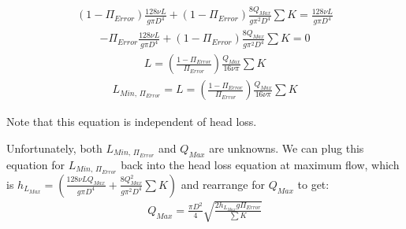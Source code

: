 \documentclass[letterpaper,10pt,english]{sphinxmanual}
\begin{document}
\begin{equation}\label{equation:Flow_Control_and_Measurement/FCM_Derivations:Flow_Control_and_Measurement/FCM_Derivations:28}
\begin{split}\left( 1 - \Pi_{Error} \right)  \frac{128 \nu L}{g \pi D^4} + \left( 1 - \Pi_{Error} \right) \frac{8 Q_{Max}}{g \pi ^2 D^4} \sum{K}  =  \frac{128 \nu L}{g \pi D^4}\end{split}
\end{equation}\begin{equation}\label{equation:Flow_Control_and_Measurement/FCM_Derivations:Flow_Control_and_Measurement/FCM_Derivations:29}
\begin{split}- \Pi_{Error} \frac{128 \nu L}{g \pi D^4} + \left( 1 - \Pi_{Error} \right) \frac{8 Q_{Max}}{g \pi^2 D^4} \sum{K}  = 0\end{split}
\end{equation}\begin{equation}\label{equation:Flow_Control_and_Measurement/FCM_Derivations:Flow_Control_and_Measurement/FCM_Derivations:30}
\begin{split}L = \left( \frac{1 - \Pi_{Error}}{\Pi_{Error}} \right) \frac{Q_{Max}}{16 \nu \pi} \sum{K}\end{split}
\end{equation}\begin{equation}\label{equation:Flow_Control_and_Measurement/FCM_Derivations:Flow_Control_and_Measurement/FCM_Derivations:31}
\begin{split}L_{Min, \, \Pi_{Error}} = L = \left( \frac{1 - \Pi_{Error}}{\Pi_{Error}} \right) \frac{Q_{Max}}{16 \nu \pi} \sum{K}\end{split}
\end{equation}
\begin{DUlineblock}{0em}
\item[] Note that this equation is independent of head loss.
\end{DUlineblock}

Unfortunately, both \(L_{Min, \, \Pi_{Error}}\) and \(Q_{Max}\) are unknowns. We can plug this equation for \(L_{Min, \, \Pi_{Error}}\) back into the head loss equation at maximum flow, which is \(h_{L_{Max}} = \left( \frac{128\nu L Q_{Max}}{g \pi D^4} + \frac{8Q_{Max}^2}{g \pi ^2 D^4} \sum{K} \right)\) and rearrange for \(Q_{Max}\) to get:
\begin{equation}\label{equation:Flow_Control_and_Measurement/FCM_Derivations:Flow_Control_and_Measurement/FCM_Derivations:32}
\begin{split}Q_{Max} = \frac{\pi D^2}{4} \sqrt{\frac{2 h_{L_{Max}} g \Pi_{Error}}{\sum K }}\end{split}
\end{equation}
\end{document}
